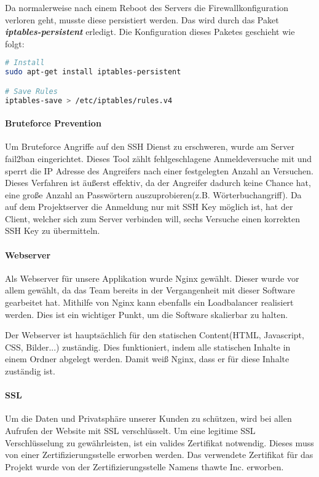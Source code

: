 Da normalerweise nach einem Reboot des Servers die Firewallkonfiguration verloren geht, musste diese persistiert werden. Das wird durch das Paket \textbf{\textit{iptables-persistent}} erledigt. Die Konfiguration dieses Paketes geschieht wie folgt\cite{FIREWALL_PERSISTENT}:

\begin{lstlisting}[caption = Installation iptables-persistent, label = firewall2, language=bash]
# Install
sudo apt-get install iptables-persistent

# Save Rules
iptables-save > /etc/iptables/rules.v4
\end{lstlisting}

\paragraph{Bruteforce Prevention}
Um Bruteforce Angriffe auf den SSH Dienst zu erschweren, wurde am Server fail2ban eingerichtet. Dieses Tool zählt fehlgeschlagene Anmeldeversuche mit und sperrt die IP Adresse des Angreifers nach einer festgelegten Anzahl an Versuchen. Dieses Verfahren ist äußerst effektiv, da der Angreifer dadurch keine Chance hat, eine große Anzahl an Passwörtern auszuprobieren(z.B. Wörterbuchangriff). Da auf dem Projektserver die Anmeldung nur mit SSH Key möglich ist, hat der Client, welcher sich zum Server verbinden will, sechs Versuche einen korrekten SSH Key zu übermitteln.
\paragraph{Webserver}
Als Webserver für unsere Applikation wurde Nginx gewählt. Dieser wurde vor allem gewählt, da das Team bereits in der Vergangenheit mit dieser Software gearbeitet hat. Mithilfe von Nginx kann ebenfalls ein Loadbalancer realisiert werden. Dies ist ein wichtiger Punkt, um die Software skalierbar zu halten. \\


Der Webserver ist hauptsächlich für den statischen Content(HTML, Javascript, CSS, Bilder...) zuständig. Dies funktioniert, indem alle statischen Inhalte in einem Ordner abgelegt werden. Damit weiß Nginx, dass er für diese Inhalte zuständig ist.

\paragraph{SSL}
Um die Daten und Privatsphäre unserer Kunden zu schützen, wird bei allen Aufrufen der Website mit \gls{SSL} verschlüsselt. Um eine legitime SSL Verschlüsselung zu gewährleisten, ist ein valides Zertifikat notwendig. Dieses muss von einer Zertifizierungsstelle erworben werden. Das verwendete Zertifikat für das Projekt wurde von der Zertifizierungsstelle Namens thawte Inc. erworben. 

